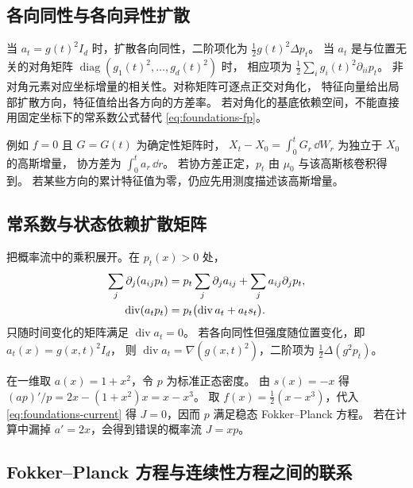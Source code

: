 \subsection{各向同性与各向异性扩散}

当 \(a_t=g(t)^2I_d\) 时，扩散各向同性，二阶项化为
\(\frac12 g(t)^2\Delta p_t\)。
当 \(a_t\) 是与位置无关的对角矩阵
\(\operatorname{diag}(g_1(t)^2,\ldots,g_d(t)^2)\) 时，
相应项为 \(\frac12\sum_i g_i(t)^2\partial_{ii}p_t\)。
非对角元素对应坐标增量的相关性。对称矩阵可逐点正交对角化，
特征向量给出局部扩散方向，特征值给出各方向的方差率。
若对角化的基底依赖空间，不能直接用固定坐标下的常系数公式替代
\eqref{eq:foundations-fp}。

例如 \(f=0\) 且 \(G=G(t)\) 为确定性矩阵时，
\(X_t-X_0=\int_0^t G_r\,\dd W_r\) 为独立于 \(X_0\) 的高斯增量，
协方差为 \(\int_0^t a_r\,\dd r\)。
若协方差正定，\(p_t\) 由 \(\mu_0\) 与该高斯核卷积得到。
若某些方向的累计特征值为零，仍应先用测度描述该高斯增量。

\subsection{常系数与状态依赖扩散矩阵}

把概率流中的乘积展开。在 \(p_t(x)>0\) 处，
\begin{align}
  \sum_j\partial_j(a_{ij}p_t)
    &=p_t\sum_j\partial_j a_{ij}+\sum_j a_{ij}\partial_j p_t,\notag\\
  \operatorname{div}(a_t p_t)
    &=p_t\bigl(\operatorname{div}a_t+a_t s_t\bigr).
    \label{eq:foundations-matrix-div}
\end{align}
只随时间变化的矩阵满足 \(\operatorname{div}a_t=0\)。
若各向同性但强度随位置变化，即 \(a_t(x)=g(x,t)^2I_d\)，
则 \(\operatorname{div}a_t=\nabla(g(x,t)^2)\)，二阶项为
\(\frac12\Delta(g^2p_t)\)。

\begin{example}[检验状态依赖项的符号]
在一维取 \(a(x)=1+x^2\)，令 \(p\) 为标准正态密度。
由 \(s(x)=-x\) 得 \((ap)'/p=2x-(1+x^2)x=x-x^3\)。
取 \(f(x)=\tfrac12(x-x^3)\)，代入 \eqref{eq:foundations-current} 得
\(J=0\)，因而 \(p\) 满足稳态 Fokker--Planck 方程。
若在计算中漏掉 \(a'=2x\)，会得到错误的概率流 \(J=xp\)。
\end{example}

\subsection{Fokker--Planck 方程与连续性方程之间的联系\requiredderivation}
\label{subsec:foundations-probability-flow}


